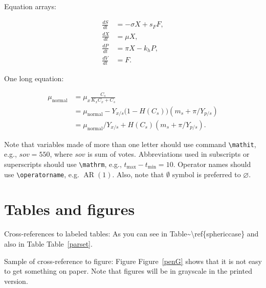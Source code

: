 \documentclass[qe,nameyear,draft]{econsocart}
\theoremstyle{plain}
\theoremstyle{remark}
\begin{document}
Equation arrays:

\begin{align}
  \frac{dS}{dt} & = - \sigma X + s_{F} F,\\
  \frac{dX}{dt} & =   \mu    X,\\
  \frac{dP}{dt} & =   \pi    X - k_{h} P,\\
  \frac{dV}{dt} & =   F.
\end{align}

One long equation:

\begin{align}
 \mu_{\text{normal}} & = \mu_{x} \frac{C_{s}}{K_{x}C_{x}+C_{s}}  \nonumber\\
                     & = \mu_{\text{normal}} - Y_{x/s}\bigl(1-H(C_{s})\bigr)(m_{s}+\pi /Y_{p/s})\nonumber\\
                     & = \mu_{\text{normal}}/Y_{x/s}+ H(C_{s}) (m_{s}+ \pi /Y_{p/s}).
\end{align}

Note that variables made of more than one letter should use command \texttt{{\textbackslash}mathit},
e.g., $\mathit{sov}=550$, where $\mathit{sov}$ is sum of votes. Abbreviations used in subscripts or superscripts should use \texttt{{\textbackslash}mathrm},
e.g., $t_{\mathrm{max}} -t_{\mathrm{min}} =10$. Operator names should use \texttt{{\textbackslash}operatorname}, e.g. $\operatorname{AR}(1)$. Also, note that $\emptyset$ symbol is preferred to $\varnothing$.

\section{Tables and figures}

Cross-references to labeled tables: As you can see in Table{\textasciitilde}{\textbackslash}ref\{sphericcase\}
and also in Table Table~\ref{parset}.

Sample of cross-reference to figure: Figure Figure~\ref{penG} shows that it is not easy to get something on paper. Note that figures will be in grayscale in the printed version.
\end{document}
